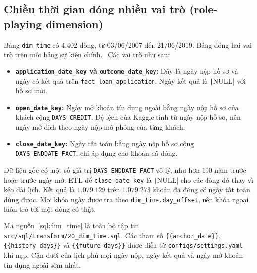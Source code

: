 \subsection{Chiều thời gian đóng nhiều vai trò (role-playing dimension)}
Bảng \texttt{dim\_time} có $4.402$ dòng, từ 03/06/2007 đến 21/06/2019. Bảng đóng hai vai trò trên mỗi bảng sự kiện chính.~\cite{kimball2013} Các vai trò như sau:
\begin{itemize}[topsep=0pt, itemsep=1pt]
	\item \textbf{\texttt{application\_date\_key} và \texttt{outcome\_date\_key}:} Đây là ngày nộp hồ sơ và ngày có kết quả trên \texttt{fact\_loan\_application}. Ngày kết quả là \texttt|NULL| với hồ sơ mới.
	\item \textbf{\texttt{open\_date\_key}:} Ngày mở khoản tín dụng ngoài bằng ngày nộp hồ sơ của khách cộng \texttt{DAYS\_CREDIT}. Độ lệch của Kaggle tính từ ngày nộp hồ sơ, nên ngày mở dịch theo ngày nộp mô phỏng của từng khách.
	\item \textbf{\texttt{close\_date\_key}:} Ngày tất toán bằng ngày nộp hồ sơ cộng \texttt{DAYS\_ENDDATE\_FACT}, chỉ áp dụng cho khoản đã đóng.
\end{itemize}

Dữ liệu gốc có một số giá trị \texttt{DAYS\_ENDDATE\_FACT} vô lý, như hơn $100$ năm trước hoặc trước ngày mở. ETL để \texttt{close\_date\_key} là \texttt|NULL| cho các dòng đó thay vì kéo dài lịch. Kết quả là $1.079.129$ trên $1.079.273$ khoản đã đóng có ngày tất toán dùng được. Mọi khóa ngày được tra theo \texttt{dim\_time.day\_offset}, nên khóa ngoại luôn trỏ tới một dòng có thật.

Mã nguồn~\ref{sql:dim_time} là toàn bộ tập tin \texttt{src/sql/transform/20\_dim\_time.sql}. Các tham số \texttt{\{\{anchor\_date\}\}}, \texttt{\{\{history\_days\}\}} và \texttt{\{\{future\_days\}\}} được điền từ \texttt{configs/settings.yaml} khi nạp. Cận dưới của lịch phủ mọi ngày nộp, ngày kết quả và ngày mở khoản tín dụng ngoài sớm nhất.

